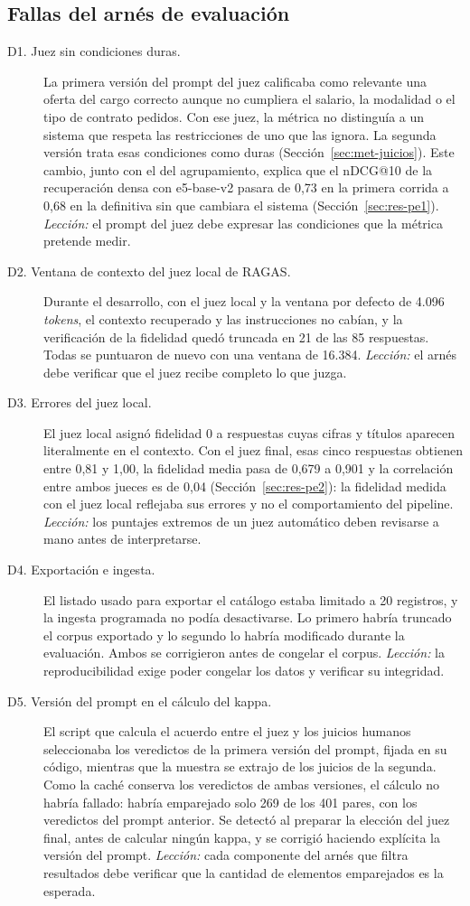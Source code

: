\subsection{Fallas del arnés de evaluación}

\begin{description}
    \item[D1. Juez sin condiciones duras.] La primera versión del prompt del juez calificaba como relevante una oferta del cargo correcto aunque no cumpliera el salario, la modalidad o el tipo de contrato pedidos. Con ese juez, la métrica no distinguía a un sistema que respeta las restricciones de uno que las ignora. La segunda versión trata esas condiciones como duras (Sección~\ref{sec:met-juicios}). Este cambio, junto con el del agrupamiento, explica que el nDCG@10 de la recuperación densa con e5-base-v2 pasara de 0,73 en la primera corrida a 0,68 en la definitiva sin que cambiara el sistema (Sección~\ref{sec:res-pe1}). \emph{Lección:} el prompt del juez debe expresar las condiciones que la métrica pretende medir.
    \item[D2. Ventana de contexto del juez local de RAGAS.] Durante el desarrollo, con el juez local y la ventana por defecto de 4.096 \textit{tokens}, el contexto recuperado y las instrucciones no cabían, y la verificación de la fidelidad quedó truncada en 21 de las 85 respuestas. Todas se puntuaron de nuevo con una ventana de 16.384. \emph{Lección:} el arnés debe verificar que el juez recibe completo lo que juzga.
    \item[D3. Errores del juez local.] El juez local asignó fidelidad 0 a respuestas cuyas cifras y títulos aparecen literalmente en el contexto. Con el juez final, esas cinco respuestas obtienen entre 0,81 y 1,00, la fidelidad media pasa de 0,679 a 0,901 y la correlación entre ambos jueces es de 0,04 (Sección~\ref{sec:res-pe2}): la fidelidad medida con el juez local reflejaba sus errores y no el comportamiento del pipeline. \emph{Lección:} los puntajes extremos de un juez automático deben revisarse a mano antes de interpretarse.
    \item[D4. Exportación e ingesta.] El listado usado para exportar el catálogo estaba limitado a 20 registros, y la ingesta programada no podía desactivarse. Lo primero habría truncado el corpus exportado y lo segundo lo habría modificado durante la evaluación. Ambos se corrigieron antes de congelar el corpus. \emph{Lección:} la reproducibilidad exige poder congelar los datos y verificar su integridad.
    \item[D5. Versión del prompt en el cálculo del kappa.] El script que calcula el acuerdo entre el juez y los juicios humanos seleccionaba los veredictos de la primera versión del prompt, fijada en su código, mientras que la muestra se extrajo de los juicios de la segunda. Como la caché conserva los veredictos de ambas versiones, el cálculo no habría fallado: habría emparejado solo 269 de los 401 pares, con los veredictos del prompt anterior. Se detectó al preparar la elección del juez final, antes de calcular ningún kappa, y se corrigió haciendo explícita la versión del prompt. \emph{Lección:} cada componente del arnés que filtra resultados debe verificar que la cantidad de elementos emparejados es la esperada.

\end{description}

